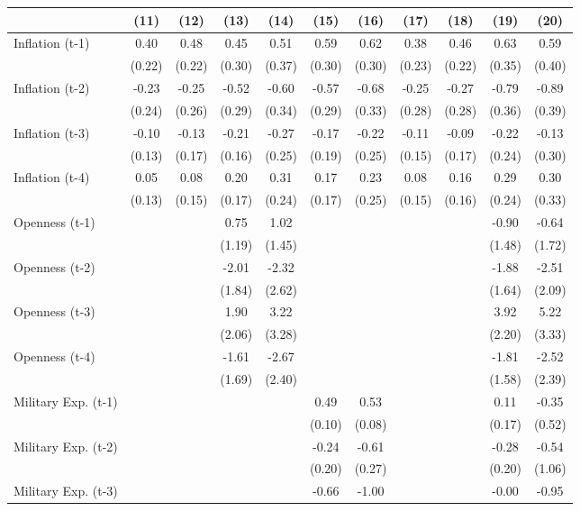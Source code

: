 \begin{tabular}{lcccccccccc}
\toprule
& (11) & (12) & (13) & (14) & (15) & (16) & (17) & (18) & (19) & (20) \\ 
\midrule
Inflation (t-1) & 0.40 & 0.48 & 0.45 & 0.51 & 0.59 & 0.62 & 0.38 & 0.46 & 0.63 & 0.59 \\
& (0.22) & (0.22) & (0.30) & (0.37) & (0.30) & (0.30) & (0.23) & (0.22) & (0.35) & (0.40) \\
Inflation (t-2) & -0.23 & -0.25 & -0.52 & -0.60 & -0.57 & -0.68 & -0.25 & -0.27 & -0.79 & -0.89 \\
& (0.24) & (0.26) & (0.29) & (0.34) & (0.29) & (0.33) & (0.28) & (0.28) & (0.36) & (0.39) \\
Inflation (t-3) & -0.10 & -0.13 & -0.21 & -0.27 & -0.17 & -0.22 & -0.11 & -0.09 & -0.22 & -0.13 \\
& (0.13) & (0.17) & (0.16) & (0.25) & (0.19) & (0.25) & (0.15) & (0.17) & (0.24) & (0.30) \\
Inflation (t-4) & 0.05 & 0.08 & 0.20 & 0.31 & 0.17 & 0.23 & 0.08 & 0.16 & 0.29 & 0.30 \\
& (0.13) & (0.15) & (0.17) & (0.24) & (0.17) & (0.25) & (0.15) & (0.16) & (0.24) & (0.33) \\
Openness (t-1) &  &  & 0.75 & 1.02 &  &  &  &  & -0.90 & -0.64 \\
&  &  & (1.19) & (1.45) &  &  &  &  & (1.48) & (1.72) \\
Openness (t-2) &  &  & -2.01 & -2.32 &  &  &  &  & -1.88 & -2.51 \\
&  &  & (1.84) & (2.62) &  &  &  &  & (1.64) & (2.09) \\
Openness (t-3) &  &  & 1.90 & 3.22 &  &  &  &  & 3.92 & 5.22 \\
&  &  & (2.06) & (3.28) &  &  &  &  & (2.20) & (3.33) \\
Openness (t-4) &  &  & -1.61 & -2.67 &  &  &  &  & -1.81 & -2.52 \\
&  &  & (1.69) & (2.40) &  &  &  &  & (1.58) & (2.39) \\
Military Exp. (t-1) &  &  &  &  & 0.49 & 0.53 &  &  & 0.11 & -0.35 \\
&  &  &  &  & (0.10) & (0.08) &  &  & (0.17) & (0.52) \\
Military Exp. (t-2) &  &  &  &  & -0.24 & -0.61 &  &  & -0.28 & -0.54 \\
&  &  &  &  & (0.20) & (0.27) &  &  & (0.20) & (1.06) \\
Military Exp. (t-3) &  &  &  &  & -0.66 & -1.00 &  &  & -0.00 & -0.95 \\

\end{tabular}
